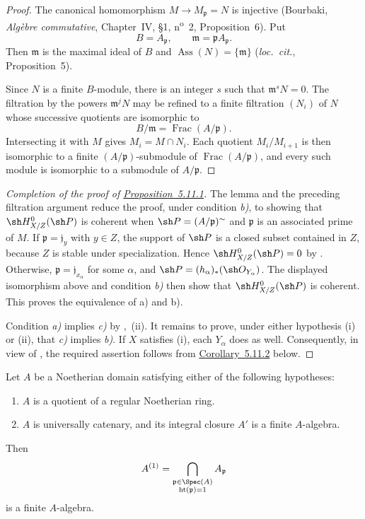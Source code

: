 \begin{proof}
The canonical homomorphism
$M\to M_{\mathfrak p}=N$ is injective
(Bourbaki, \emph{Alg\`ebre commutative}, Chapter~IV,
\S1, n\textsuperscript{o}~2, Proposition~6).  Put
\[
  B=A_{\mathfrak p},
  \qquad
  \mathfrak m=\mathfrak pA_{\mathfrak p}.
\]
Then $\mathfrak m$ is the maximal ideal of $B$ and
$\operatorname{Ass}(N)=\{\mathfrak m\}$
(\emph{loc.\ cit.}, Proposition~5).


Since $N$ is a finite
$B$-module, there is an integer $s$ such that
$\mathfrak m^sN=0$.  The filtration by the powers
$\mathfrak m^jN$ may be refined to a finite filtration
$(N_i)$ of $N$ whose successive quotients are isomorphic to
\[
  B/\mathfrak m=\operatorname{Frac}(A/\mathfrak p).
\]
Intersecting it with $M$ gives $M_i=M\cap N_i$.  Each quotient
$M_i/M_{i+1}$ is then isomorphic to a finite
$(A/\mathfrak p)$-submodule of
$\operatorname{Frac}(A/\mathfrak p)$, and every such module is
isomorphic to a submodule of $A/\mathfrak p$.
\end{proof}

\begin{proof}[Completion of the proof of {\hyperref[IV.5.11.1]{Proposition~5.11.1}}]
The lemma and the preceding filtration argument reduce the proof,
under condition \emph{b)}, to showing that
$\sh H^0_{X/Z}(\sh P)$ is coherent when $\sh P=(A/\mathfrak p)^{\sim}$
and $\mathfrak p$ is an associated prime of $M$.  If
$\mathfrak p=\mathfrak j_y$ with $y\in Z$, the support of
$\sh P$ is a closed subset contained in $Z$, because $Z$ is
stable under specialization.  Hence
$\sh H^0_{X/Z}(\sh P)=0$ by .  Otherwise,
$\mathfrak p=\mathfrak j_{x_\alpha}$ for some $\alpha$, and $\sh P=(h_\alpha)_*(\sh O_{Y_\alpha})$.
The displayed isomorphism above and condition \emph{b)} then show
that $\sh H^0_{X/Z}(\sh P)$ is coherent.  This proves the
equivalence of {\rm a)} and {\rm b)}.

Condition \emph{a)} implies \emph{c)} by
,~(ii).  It remains to prove, under either
hypothesis {\rm(i)} or {\rm(ii)}, that \emph{c)} implies \emph{b)}.
If $X$ satisfies {\rm(i)}, each $Y_\alpha$ does as well.
Consequently, in view of , the required
assertion follows from {\hyperref[IV.5.11.2]{Corollary~5.11.2}} below.
\end{proof}

\begin{corollary}[5.11.2]
\label{IV.5.11.2}
Let $A$ be a Noetherian domain satisfying either of the following
hypotheses:
\begin{enumerate}[{\rm(i)}]
  \item $A$ is a quotient of a regular Noetherian ring.
  \item $A$ is universally catenary, and its integral closure
  $A'$ is a finite $A$-algebra.
\end{enumerate}
Then
\[
  A^{(1)}
  =\bigcap_{\substack{\mathfrak p\in\Spec(A)\\
                      \operatorname{ht}(\mathfrak p)=1}}
    A_{\mathfrak p}
\]
is a finite $A$-algebra.
\end{corollary}

